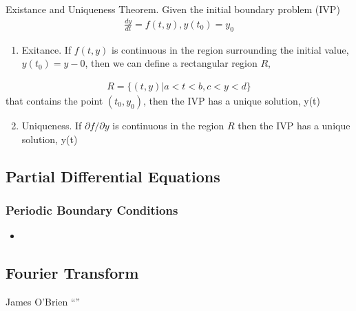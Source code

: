 \documentclass[letterpaper,10pt,english]{sphinxmanual}
\begin{document}
Existance and Uniqueness Theorem.  Given the initial boundary problem (IVP)
\begin{equation*}
\begin{split}\frac{dy}{dt} = f(t,y), y(t_0)=y_0\end{split}
\end{equation*}\begin{enumerate}
\item {} 
Exitance.  If \(f(t,y)\) is continuous in the region surrounding the initial value, \(y(t_0)=y-0\), then we can define a rectangular region \(R\),

\end{enumerate}
\begin{equation*}
\begin{split}R = \bigl \{(t,y)|a<t<b,c<y<d \bigr \}\end{split}
\end{equation*}
that contains the point \((t_0,y_0)\), then the IVP has a unique solution, y(t)
\begin{enumerate}
\setcounter{enumi}{1}
\item {} 
Uniqueness.  If \(\partial f / \partial y\) is continuous in the region \(R\) then the IVP has a unique solution, y(t)

\end{enumerate}


\subsection{Partial Differential Equations}
\label{\detokenize{math/periodic_boundary_conditions:partial-differential-equations}}\label{\detokenize{math/periodic_boundary_conditions::doc}}

\subsubsection{Periodic Boundary Conditions}
\label{\detokenize{math/periodic_boundary_conditions:periodic-boundary-conditions}}\begin{itemize}
\item {} 

\end{itemize}


\subsection{Fourier Transform}
\label{\detokenize{math/fourier_transform:fourier-transform}}\label{\detokenize{math/fourier_transform::doc}}
James O’Brien “”
\end{document}
